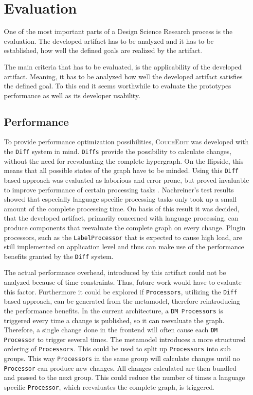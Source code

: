 \chapter{Evaluation}
\label{ch:evaluation}
One of the most important parts of a Design Science Research process is the evaluation. The developed artifact has to be analyzed and it has to be established, how well the defined goals are realized by the artifact.

The main criteria that has to be evaluated, is the applicability of the developed artifact. Meaning, it has to be analyzed how well the developed artifact satisfies the defined goal. To this end it seems worthwhile to evaluate the prototypes performance as well as its developer usability. 

\section{Performance}
To provide performance optimization possibilities, \textsc{CouchEdit} was developed with the \texttt{Diff} system in mind. \texttt{Diffs} provide the possibility to calculate changes, without the need for reevaluating the complete hypergraph. On the flipside, this means that all possible states of the graph have to be minded. Using this \texttt{Diff} based approach was evaluated as laborious and error prone, but proved invaluable to improve performance of certain processing tasks \cite{nachreiner_couchedit_2020}. Nachreiner's test results showed that especially language specific processing tasks only took up a small amount of the complete processing time. On basis of this result it was decided, that the developed artifact, primarily concerned with language processing, can produce components that reevaluate the complete graph on every change. Plugin processors, such as the \texttt{LabelProcessor} that is expected to cause high load, are still implemented on application level and thus can make use of the performance benefits granted by the \texttt{Diff} system. 

The actual performance overhead, introduced by this artifact could not be analyzed because of time constraints. Thus, future work would have to evaluate this factor. Furthermore it could be explored if \texttt{Processors}, utilizing the \texttt{Diff} based approach, can be generated from the metamodel, therefore reintroducing the performance benefits. In the current architecture, a \texttt{DM Processors} is triggered every time a change is published, so it can reevaluate the graph. Therefore, a single change done in the frontend will often cause each \texttt{DM Processor} to trigger several times. The metamodel introduces a more structured ordering of \texttt{Processors}. This could be used to split up \texttt{Processors} into sub groups. This way \texttt{Processors} in the same group will calculate changes until no \texttt{Processor} can produce new changes. All changes calculated are then bundled and passed to the next group. This could reduce the number of times a language specific \texttt{Processor}, which reevaluates the complete graph, is triggered.  

